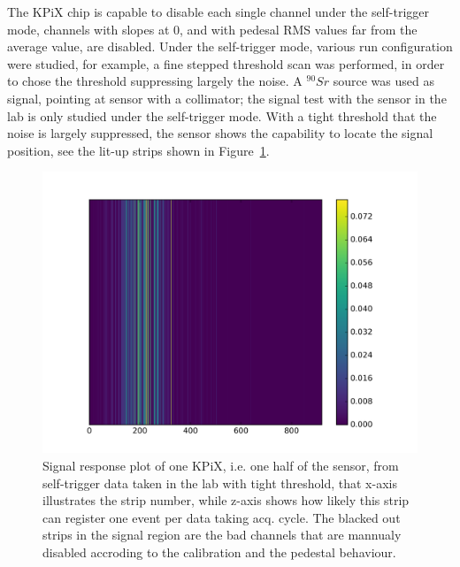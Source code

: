 \documentclass[conference]{IEEEtran}
\begin{document}
The KPiX chip is capable to disable each single channel under the self-trigger mode,
channels with slopes at $0$, and with pedesal RMS values far from the average value, are disabled.
Under the self-trigger mode, various run configuration were studied,
for example, a fine stepped threshold scan was performed, in order to chose the threshold suppressing largely the noise.
A $^{90}Sr$ source was used as signal, pointing at sensor with a collimator;
the signal test with the sensor in the lab is only studied under the self-trigger mode.
With a tight threshold that the noise is largely suppressed, the sensor shows the capability to locate the signal position, see the lit-up strips shown in Figure~\ref{fig:lab2}.

\begin{figure}[!ht]%
  \centering
  \includegraphics[width=1.0\linewidth]{pics/2018_07_13_16_34_20_strip_map_left.png}
  \caption{
  Signal response plot of one KPiX, i.e. one half of the sensor, from self-trigger data taken in the lab with tight threshold,
  that x-axis illustrates the strip number, while z-axis shows how likely this strip can register one event per data taking acq. cycle.
  The blacked out strips in the signal region are the bad channels that are mannualy disabled accroding to the calibration and the pedestal behaviour.
  }%
\label{fig:lab2}%
\end{figure}
\end{document}
